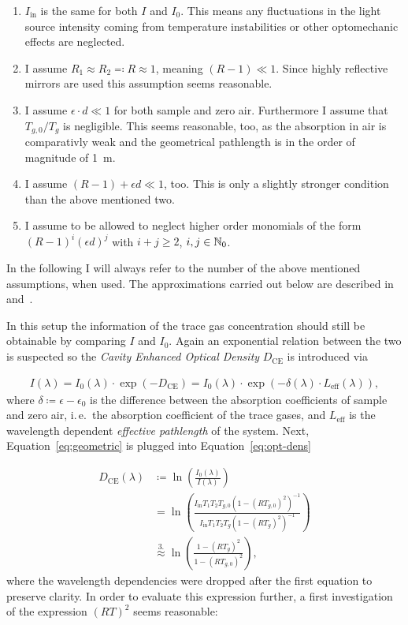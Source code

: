 \begin{enumerate}
\item $I_{\text{in}}$ is the same for both $I$ and $I_0$. This means
  any fluctuations in the light source intensity coming from
  temperature instabilities or other optomechanic effects are
  neglected.
\item I assume $R_1 \approx R_2 \eqqcolon R \approx 1$, meaning $(R -
  1) \ll 1$. Since highly reflective mirrors are used this assumption
  seems reasonable.
\item I assume $\epsilon \cdot d \ll 1$ for both sample and zero
  air. Furthermore I assume that $T_{g,0}/T_{g}$ is negligible. This
  seems reasonable, too, as the absorption in 
  air is comparativly weak and the geometrical pathlength is in the
  order of magnitude of \SI{1}{\meter}.
\item I assume $(R - 1) + \epsilon d \ll 1$, too. This is only a
  slightly stronger condition than the above mentioned two.
\item I assume to be allowed to neglect higher order monomials of the
  form $(R-1)^i(\epsilon d)^j$  with $i+j \geq 2$, $i,j \in \mathbb{N}_0$.
\end{enumerate}

In the following I will always refer to the number of the above
mentioned assumptions, when used. The approximations carried out below
are described in~\cite{platt2009} and~\cite{fiedler2003}.

In this setup the information of the trace gas concentration should
still be obtainable by comparing $I$ and $I_0$. Again an exponential
relation between the two is suspected so the \emph{Cavity Enhanced
  Optical Density} $D_{\text{CE}}$ is introduced via

\begin{align}
  I(\lambda) = I_0(\lambda) \cdot \exp(- D_{\text{CE}}) = I_0(\lambda)
  \cdot \exp(-\delta(\lambda) \cdot L_{\text{eff}}(\lambda)),\label{eq:opt-dens}
\end{align}
where $\delta \coloneqq \epsilon - \epsilon_0$ is the difference
between the absorption coefficients of sample and zero air, i.\,e.\ the
absorption coefficient of the trace gases, and $L_{\text{eff}}$ is the
wavelength dependent \emph{effective pathlength} of the system. Next,
Equation~\eqref{eq:geometric} is plugged into Equation~\eqref{eq:opt-dens}

\begin{align}
  D_{\text{CE}}(\lambda) & \coloneqq \ln\left(
                           \frac{I_0(\lambda)}{I(\lambda)}\right)\nonumber\\
                         & = \ln\left ( \frac{I_{\text{in}}T_1T_2T_{g,0}(1 -
                           (RT_{g,0})^2)^{-1}}{I_{\text{in}}T_1T_2T_g(1 -
                           (RT_g)^2)^{-1}}\right)\nonumber\\
                         & \stackrel{3.}{\approx} \ln\left( \frac{1 -
                           (RT_g)^2}{1 - (RT_{g,0})^2}\right)\label{eq:d_ce},
\end{align}
where the wavelength dependencies were dropped after the first
equation to preserve clarity. In order to evaluate this expression further, a
first investigation of the expression $(RT)^2$ seems reasonable:

